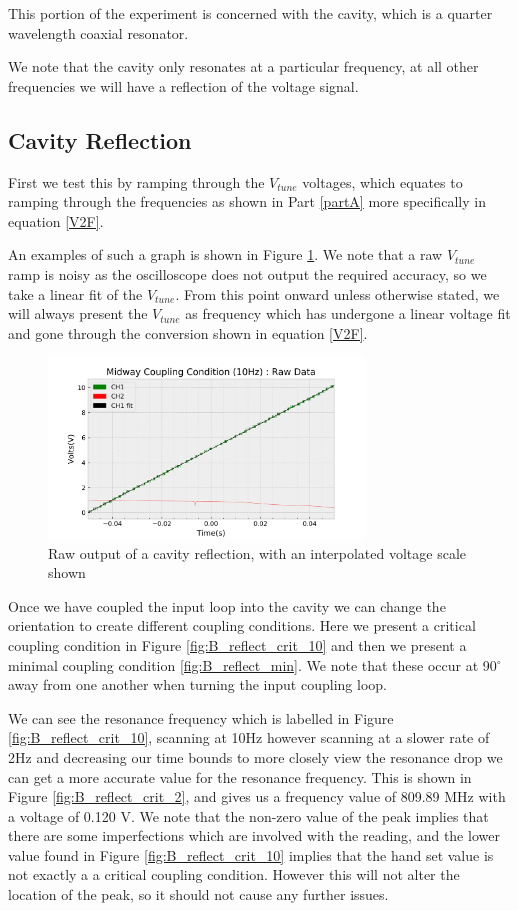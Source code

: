 This portion of the experiment is concerned with the cavity, which  is a quarter wavelength coaxial resonator.

We note that the cavity only resonates at a particular frequency, at all other frequencies we will have a reflection of the voltage signal.

\subsection{Cavity Reflection}
First we test this by ramping through the $V_{tune}$ voltages, which equates to ramping through the frequencies as shown in Part \ref{partA} more specifically in equation \ref{V2F}.

An examples of such a graph is shown in Figure \ref{fig:scope3_raw}. We note that a raw $V_{tune}$ ramp is noisy as the oscilloscope does not output the required accuracy, so we take a linear fit of the $V_{tune}$. From this point onward unless otherwise stated, we will always present the $V_{tune}$ as frequency which has undergone a linear voltage fit and gone through the conversion shown in equation \ref{V2F}. 

\begin{figure}[H]
\centering
\includegraphics[width=0.75\textwidth]{figures/PartB/scope_3_raw.png}
\caption{Raw output of a cavity reflection, with an interpolated voltage scale shown}
\label{fig:scope3_raw}
\end{figure}

Once we have coupled the input loop into the cavity we can change the orientation to create different coupling conditions. Here we present a critical coupling condition in Figure \ref{fig:B_reflect_crit_10} and then we present a minimal coupling condition \ref{fig:B_reflect_min}. We note that these occur at 90$^\circ$ away from one another when turning the input coupling loop.

We can see the resonance frequency which is labelled in Figure \ref{fig:B_reflect_crit_10}, scanning at 10Hz however scanning at a slower rate of 2Hz and decreasing our time bounds to more closely view the resonance drop we can get a more accurate value for the resonance frequency. This is shown in Figure \ref{fig:B_reflect_crit_2}, and gives us a frequency value of 809.89 MHz with a voltage of 0.120 V. We note that the non-zero value of the peak implies that there are some imperfections which are involved with the reading, and the lower value found in Figure \ref{fig:B_reflect_crit_10} implies that the hand set value is not exactly a a critical coupling condition. However this will not alter the location of the peak, so it should not cause any further issues.

